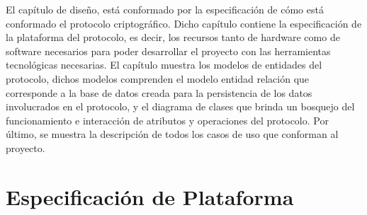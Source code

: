 
El capítulo de diseño, está conformado por la especificación de cómo está conformado el protocolo criptográfico. Dicho capítulo contiene la especificación de la plataforma del protocolo, es decir, los recursos tanto de hardware como de software necesarios para poder desarrollar el proyecto con las herramientas tecnológicas necesarias. El capítulo muestra los modelos de entidades del protocolo, dichos modelos comprenden el modelo entidad relación que corresponde a la base de datos creada para la persistencia de los datos involucrados en el protocolo, y el diagrama de clases que brinda un bosquejo del funcionamiento e interacción de atributos y operaciones del protocolo. Por último, se muestra la descripción de todos los casos de uso que conforman al proyecto. 





\section{Especificación de Plataforma}



